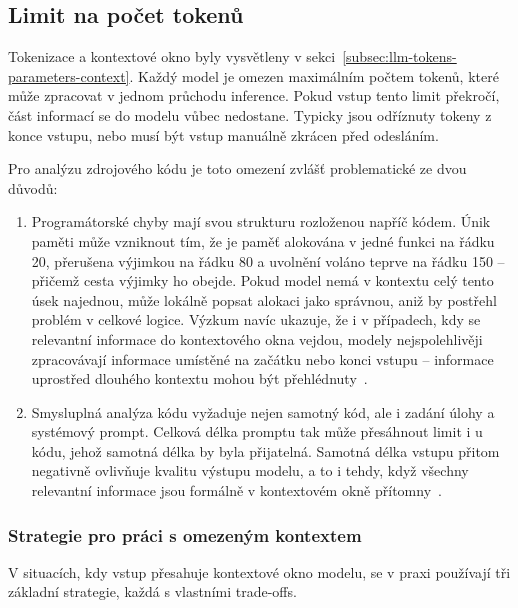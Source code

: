 \subsection{Limit na počet tokenů}
\label{subsec:llm-token-limit}

Tokenizace a kontextové okno byly vysvětleny v sekci~\ref{subsec:llm-tokens-parameters-context}.
Každý model je omezen maximálním počtem tokenů, které může zpracovat v jednom průchodu inference.
Pokud vstup tento limit překročí, část informací se do modelu vůbec nedostane.
Typicky jsou odříznuty tokeny z konce vstupu, nebo musí být vstup manuálně zkrácen před odesláním.

Pro analýzu zdrojového kódu je toto omezení zvlášť problematické ze dvou důvodů:
\begin{enumerate}
    \item Programátorské chyby mají svou strukturu rozloženou napříč kódem.
    Únik paměti může vzniknout tím, že je paměť alokována v jedné funkci na řádku 20, přerušena výjimkou na řádku 80 a uvolnění voláno teprve na řádku 150 -- přičemž cesta výjimky ho obejde.
    Pokud model nemá v kontextu celý tento úsek najednou, může lokálně popsat alokaci jako správnou, aniž by postřehl problém v celkové logice.
    Výzkum navíc ukazuje, že i v případech, kdy se relevantní informace do kontextového okna vejdou, modely nejspolehlivěji zpracovávají informace umístěné na začátku nebo konci vstupu -- informace uprostřed dlouhého kontextu mohou být přehlédnuty~\cite{liu-lost}.

    \item Smysluplná analýza kódu vyžaduje nejen samotný kód, ale i zadání úlohy a systémový prompt.
    Celková délka promptu tak může přesáhnout limit i u kódu, jehož samotná délka by byla přijatelná.
    Samotná délka vstupu přitom negativně ovlivňuje kvalitu výstupu modelu, a to i tehdy, když všechny relevantní informace jsou formálně v kontextovém okně přítomny~\cite{hosseini-efficient}.
\end{enumerate}

\subsubsection*{Strategie pro práci s omezeným kontextem}

V situacích, kdy vstup přesahuje kontextové okno modelu, se v praxi používají tři základní strategie, každá s vlastními trade-offs.

